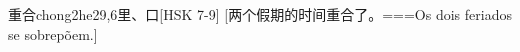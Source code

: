 \begin{EntryWithPhonetic}{重合}{chong2he2}{9,6}{⾥、⼝}[HSK 7-9]
  [两个假期的时间重合了。===Os dois feriados se sobrepõem.]
\end{EntryWithPhonetic}

